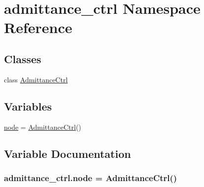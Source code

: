 \hypertarget{namespaceadmittance__ctrl}{}\section{admittance\+\_\+ctrl Namespace Reference}
\label{namespaceadmittance__ctrl}
\subsection*{Classes}
\begin{DoxyCompactItemize}
\item 
class \hyperlink{classadmittance__ctrl_1_1AdmittanceCtrl}{Admittance\+Ctrl}
\end{DoxyCompactItemize}
\subsection*{Variables}
\begin{DoxyCompactItemize}
\item 
\hyperlink{namespaceadmittance__ctrl_afea3593bd3ba80364f80f609075607fb}{node} = \hyperlink{classadmittance__ctrl_1_1AdmittanceCtrl}{Admittance\+Ctrl}()
\end{DoxyCompactItemize}


\subsection{Variable Documentation}
\subsubsection[{\texorpdfstring{node}{node}}]{\setlength{\rightskip}{0pt plus 5cm}admittance\+\_\+ctrl.\+node = {\bf Admittance\+Ctrl}()}\hypertarget{namespaceadmittance__ctrl_afea3593bd3ba80364f80f609075607fb}{}\label{namespaceadmittance__ctrl_afea3593bd3ba80364f80f609075607fb}

